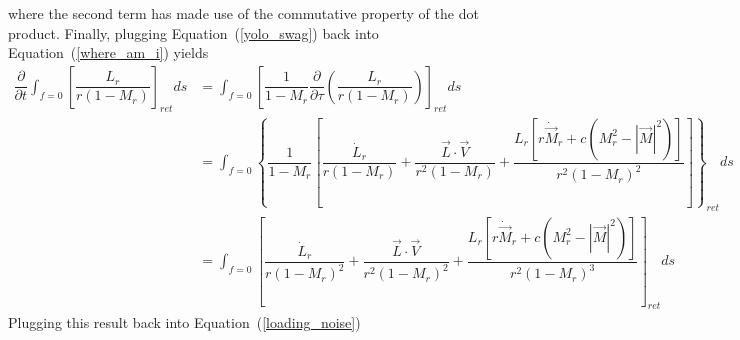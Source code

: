 \documentclass[onecolumn,10pt]{jhwhw}
\begin{document}
where the second term has made use of the commutative property of the dot product. Finally, plugging Equation~(\ref{yolo_swag}) back into Equation~(\ref{where_am_i}) yields
\begin{align*}
\dfrac{\partial}{\partial t} \int_{f=0} \left[ \dfrac{L_r}{r (1 - M_r)} \right]_{ret} ds
&= \int_{f=0} \left[
    \dfrac{1}{1 - M_r} \dfrac{\partial}{\partial \tau}
    \left( \dfrac{L_r}{r   (1 - M_r)}  \right)
    \right]_{ret} ds \\
&= \int_{f=0} \left\{
    \dfrac{1}{1 - M_r} \left[
    \dfrac{\dot{L}_r}{r (1 - M_r)}
    + \dfrac{\vec{L}\cdot\vec{V}}{r^2 (1 - M_r)}
    + \dfrac{ L_r \left[
        r\dot{\vec{M}}_r + c \left( M_r^2 - |\vec{M}|^2 \right) \right] }
        {r^2 (1 - M_r)^2} \right]
    \right\}_{ret} ds \\
&= \int_{f=0} \left[
    \dfrac{\dot{L}_r}{r (1 - M_r)^2}
    + \dfrac{\vec{L}\cdot\vec{V}}{r^2 (1 - M_r)^2}
    + \dfrac{ L_r \left[
        r\dot{\vec{M}}_r + c \left( M_r^2 - |\vec{M}|^2 \right) \right] }
        {r^2 (1 - M_r)^3}
    \right]_{ret} ds
\end{align*}
Plugging this result back into Equation~(\ref{loading_noise})
\end{document}
